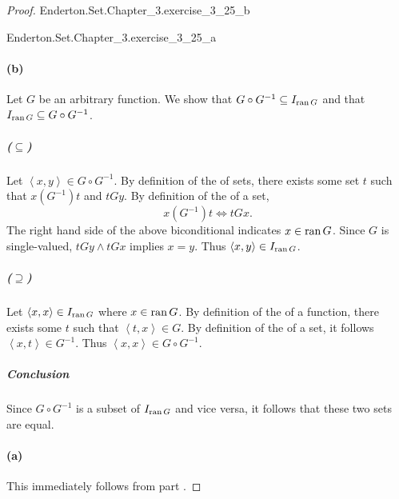 \documentclass{report}
\newcommand{\pair}[1]{\left< #1 \right>}
\begin{document}
\begin{proof}

  \statementpadding

    {Enderton.Set.Chapter\_3.exercise\_3\_25\_b}

    {Enderton.Set.Chapter\_3.exercise\_3\_25\_a}

  \paragraph{(b)}%

    Let $G$ be an arbitrary function.
    We show that $G \circ G^{-1} \subseteq I_{\mathop{\text{ran}}{G}}$ and that
      $I_{\mathop{\text{ran}}{G}} \subseteq G \circ G^{-1}$.

    \subparagraph{($\subseteq$)}%

      Let $\pair{x, y} \in G \circ G^{-1}$.
      By definition of the  of sets, there exists some
        set $t$ such that $x(G^{-1})t$ and $tGy$.
      By definition of the  of a set,
        $$x(G^{-1})t \iff tGx.$$
      The right hand side of the above biconditional indicates $x \in \mathop{\text{ran}}{G}$.
      Since $G$ is single-valued, $tGy \land tGx$ implies $x = y$.
      Thus $\pair{x, y} \in I_{\ran{G}}$.

    \subparagraph{($\supseteq$)}%

      Let $\pair{x, x} \in I_{\ran{G}}$ where $x \in \mathop{\text{ran}}{G}$.
      By definition of the  of a function, there exists some
        $t$ such that $\pair{t, x} \in G$.
      By definition of the  of a set, it follows
        $\pair{x, t} \in G^{-1}$.
      Thus $\pair{x, x} \in G \circ G^{-1}$.

    \subparagraph{Conclusion}%

      Since $G \circ G^{-1}$ is a subset of $I_{\mathop{\text{ran}}{G}}$ and vice versa, it
        follows that these two sets are equal.

  \paragraph{(a)}%

    This immediately follows from part .

\end{proof}

\subsection{}%
\end{document}
